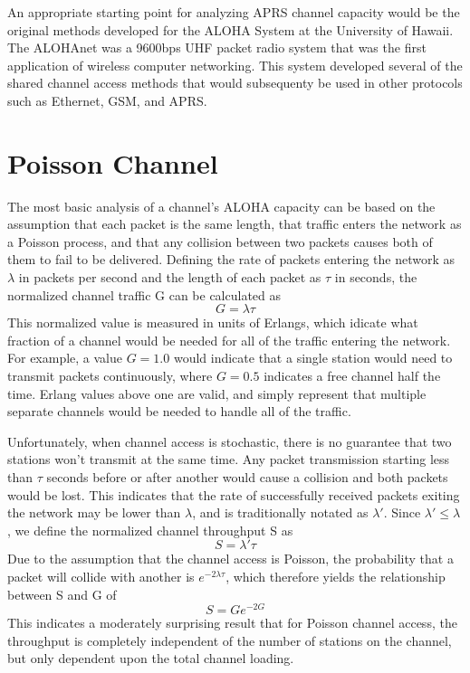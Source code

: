 An appropriate starting point for analyzing APRS channel capacity would be the original methods
developed for the ALOHA System at the University of Hawaii\cite{packetthroughput}.
The ALOHAnet was a 9600bps UHF packet radio system that was the first application of 
wireless computer networking.
This system developed several of the shared channel access methods 
that would subsequenty be used in other protocols such as Ethernet, GSM, and APRS.

\section{Poisson Channel}

The most basic analysis of a channel's ALOHA capacity can be based on the assumption that
each packet is the same length, 
that traffic enters the network as a Poisson process,
and that any collision between two packets causes both of them to fail to be delivered.
Defining the rate of packets entering the network as $\lambda$ in packets per second and
the length of each packet as $\tau$ in seconds, the normalized channel traffic G can be
calculated as
\begin{equation}
	G = \lambda \tau
\end{equation}
This normalized value is measured in units of Erlangs,
which idicate what fraction of a channel would be needed for all
of the traffic entering the network.
For example, a value $G=1.0$ would indicate that
a single station would need to transmit packets continuously, where $G=0.5$ indicates 
a free channel half the time.
Erlang values above one are valid, and simply represent that multiple separate
channels would be needed to handle all of the traffic.

Unfortunately, when channel access is stochastic,
there is no guarantee that two stations won't transmit at the same time.
Any packet transmission starting less than $\tau$ seconds before or after another would
cause a collision and both packets would be lost.
This indicates that the rate of successfully received packets exiting the network may
be lower than $\lambda$, and is traditionally notated as $\lambda'$. 
Since $\lambda' \leq \lambda$, we define the normalized channel throughput S as
\begin{equation}
	S = \lambda' \tau
\end{equation}
Due to the assumption that the channel access is Poisson, 
the probability that a packet will collide with another is $e^{-2 \lambda \tau}$,
which therefore yields the relationship between S and G of
\begin{equation}
	S = G e ^ {-2 G}
\end{equation}
This indicates a moderately surprising result that for Poisson channel access,
the throughput is completely independent of the number of stations on the channel,
but only dependent upon the total channel loading.

